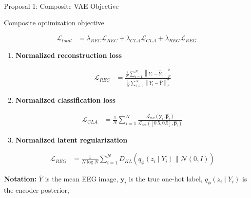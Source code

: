 \documentclass[aspectratio=169]{beamer}
\begin{document}
\begin{frame}{Proposal 1: Composite VAE Objective}
\scriptsize
\setlength{\abovedisplayskip}{2pt}
\setlength{\belowdisplayskip}{2pt}
\setlength{\jot}{2pt}

\begin{block}{Composite optimization objective}

\begin{align*}
\mathcal{L}_{total}
&=
\lambda_{REC}\mathcal{L}_{REC}
+
\lambda_{CLA}\mathcal{L}_{CLA}
+
\lambda_{REG}\mathcal{L}_{REG}
\end{align*}

\end{block}


\begin{enumerate}
\setlength{\itemsep}{0.08cm}

\item \textbf{Normalized reconstruction loss}

\begin{align*}
\mathcal{L}_{REC}
&=
\frac{
\frac{1}{N}
\sum_{i=1}^{N}
\left\|
Y_i-\hat{Y}_i
\right\|_F^2
}{
\frac{1}{N}
\sum_{i=1}^{N}
\left\|
Y_i-\bar{Y}
\right\|_F^2
}
\end{align*}

\item \textbf{Normalized classification loss}

\begin{align*}
\mathcal{L}_{CLA}
&=
\frac{1}{N}
\sum_{i=1}^{N}
\frac{
\mathcal{L}_{\mathrm{cce}}
\left(
\mathbf{y}_i,\hat{\mathbf{p}}_i
\right)
}{
\mathcal{L}_{\mathrm{cce}}
\left(
[0.5,0.5],\hat{\mathbf{p}}_i
\right)
}
\end{align*}

\item \textbf{Normalized latent regularization}

\begin{align*}
\mathcal{L}_{REG}
&=
\frac{1}{N\log N}
\sum_{i=1}^{N}
D_{KL}
\left(
q_{\phi}(z_i\mid Y_i)
\parallel
\mathcal{N}(0,I)
\right)
\end{align*}

\end{enumerate}

{\scriptsize
\textbf{Notation:} $\bar{Y}$ is the mean EEG image,
$\mathbf{y}_i$ is the true one-hot label,
$q_{\phi}(z_i\mid Y_i)$ is the encoder posterior,}

\end{frame}
\end{document}
